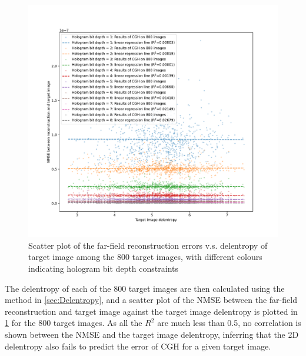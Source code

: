 	\begin{figure} [H]
		\begin{center}
		\includegraphics[trim={50 40 70 70}, clip, width = \textwidth]{GS_Fraunhofer_NMSE_VS_Delentropy.pdf}
		\end{center}
		\caption{\label{fig:GS_Fraunhofer_NMSE_VS_Delentropy} Scatter plot of the far-field reconstruction errors v.s. delentropy of target image among the 800 target images, with different colours indicating hologram bit depth constraints}
	\end{figure}

	The delentropy of each of the 800 target images are then calculated using the method in \cref{sec:Delentropy}, and a scatter plot of the NMSE between the far-field reconstruction and target image against the target image delentropy is plotted in \cref{fig:GS_Fraunhofer_NMSE_VS_Delentropy} for the 800 target images. As all the $R^2$ are much less than 0.5, no correlation is shown between the NMSE and the target image delentropy, inferring that the 2D delentropy also fails to predict the error of CGH for a given target image.


